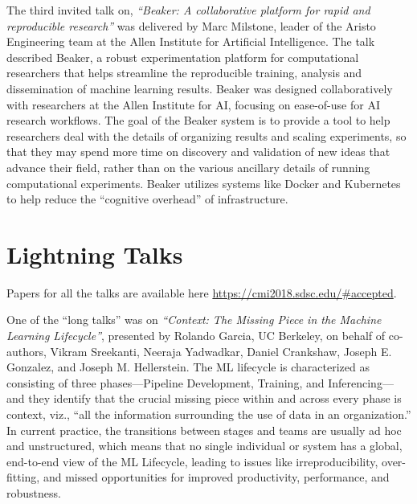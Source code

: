 \documentclass[11pt]{article}
\begin{document}
The third invited talk on, \emph{``Beaker: A collaborative platform for rapid and reproducible research''} was delivered by Marc Milstone, leader of the Aristo Engineering team at the Allen Institute for Artificial Intelligence. The talk described Beaker, a robust experimentation platform for computational researchers that helps streamline the reproducible training, analysis and dissemination of machine learning results. Beaker was designed collaboratively with researchers at the Allen Institute for AI, focusing on ease-of-use for AI research workflows. The goal of the Beaker system is to provide a tool to help researchers deal with the details of organizing results and scaling experiments, so that they may spend more time on discovery and validation of new ideas that advance their field, rather than on the various ancillary details of running computational experiments. Beaker utilizes systems like Docker and Kubernetes to help reduce the ``cognitive overhead'' of infrastructure.


\section{Lightning Talks}

Papers for all the talks are available here \url{https://cmi2018.sdsc.edu/#accepted}.

One of the ``long talks'' was on \emph{``Context: The Missing Piece in the Machine Learning Lifecycle''}, presented by Rolando Garcia, UC Berkeley, on behalf of co-authors, Vikram Sreekanti, Neeraja Yadwadkar, Daniel Crankshaw, Joseph E. Gonzalez, and Joseph M. Hellerstein. The ML lifecycle is characterized as consisting of three phases---Pipeline Development, Training, and Inferencing---and they identify that the crucial missing piece within and across every phase is context, viz., “all the information surrounding the use of data in an organization.” In current practice, the transitions between stages and teams are usually ad hoc and unstructured, which means that no single individual or system has a global, end-to-end view of the ML Lifecycle, leading to issues like irreproducibility, over-fitting, and missed opportunities for improved productivity, performance, and robustness.
\end{document}
